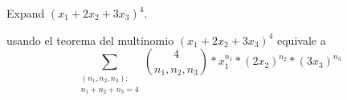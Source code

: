 \item Expand $(x_1 + 2 x_2 + 3 x_3)^4$.

usando el teorema del multinomio $(x_1 + 2 x_2 + 3 x_3)^4$ equivale a
\[ \sum_{\substack{(n_1, n_2, n_3):\\n_1 + n_2 + n_3 = 4}} \binom{4}{n_1, n_2, n_3} * x_1^{n_1} * (2 x_2)^{n_2} * (3 x_3)^{n_3} \]